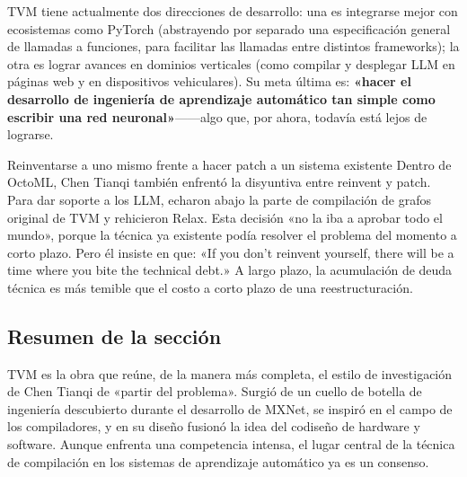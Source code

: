 TVM tiene actualmente dos direcciones de desarrollo: una es integrarse mejor con ecosistemas como PyTorch (abstrayendo por separado una especificación general de llamadas a funciones, para facilitar las llamadas entre distintos frameworks); la otra es lograr avances en dominios verticales (como compilar y desplegar LLM en páginas web y en dispositivos vehiculares). Su meta última es: \textbf{«hacer el desarrollo de ingeniería de aprendizaje automático tan simple como escribir una red neuronal»}------algo que, por ahora, todavía está lejos de lograrse.

\begin{warningbox}{Reinventarse a uno mismo frente a hacer patch a un sistema existente}
Dentro de OctoML, Chen Tianqi también enfrentó la disyuntiva entre reinvent y patch. Para dar soporte a los LLM, echaron abajo la parte de compilación de grafos original de TVM y rehicieron Relax. Esta decisión «no la iba a aprobar todo el mundo», porque la técnica ya existente podía resolver el problema del momento a corto plazo. Pero él insiste en que: «If you don't reinvent yourself, there will be a time where you bite the technical debt.» A largo plazo, la acumulación de deuda técnica es más temible que el costo a corto plazo de una reestructuración.
\end{warningbox}

\subsection{Resumen de la sección}

TVM es la obra que reúne, de la manera más completa, el estilo de investigación de Chen Tianqi de «partir del problema». Surgió de un cuello de botella de ingeniería descubierto durante el desarrollo de MXNet, se inspiró en el campo de los compiladores, y en su diseño fusionó la idea del codiseño de hardware y software. Aunque enfrenta una competencia intensa, el lugar central de la técnica de compilación en los sistemas de aprendizaje automático ya es un consenso.
